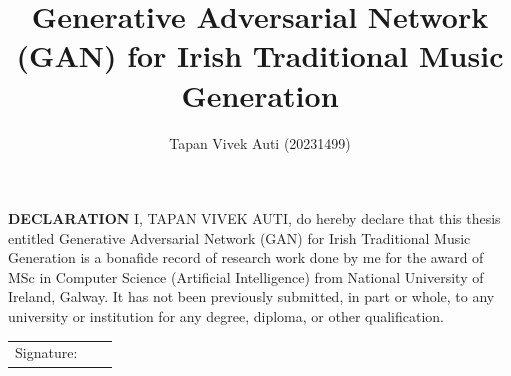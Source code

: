 \documentclass[oneside,12pt]{Classes/RoboticsLaTeX}
\title{\Large{Generative Adversarial Network (GAN) for Irish Traditional Music Generation}}
\author{Tapan Vivek Auti (20231499)}
\begin{document}
\begin{spacing}{1}
\maketitle
\end{spacing}
\titleformat{\chapter}[display]
  {\normalfont\huge\bfseries}{\vskip-2.5em\chaptertitlename\ \thechapter}{20pt}{\Large}



\newpage\null\thispagestyle{empty}\newpage

\setcounter{secnumdepth}{3}
\setcounter{tocdepth}{3}

\frontmatter
\textbf{DECLARATION} 
I, TAPAN VIVEK AUTI, do hereby declare that this thesis entitled Generative Adversarial Network (GAN) for Irish Traditional Music Generation is a bonafide record of research work done by me for the award of MSc in Computer Science (Artificial Intelligence) from National University of Ireland, Galway. It has not been previously submitted, in part or whole, to any university or institution for any degree, diploma, or other qualification. 
\newline

\begin{tabular}{@{}p{.5in}p{4in}@{}}
Signature: & ~~\hrulefill \\
\end{tabular}
\newpage


%
%


\end{document}
